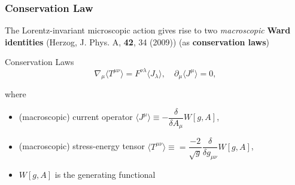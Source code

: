 \documentclass[10pt,aspectratio=43,xcolor=x11names,t]{beamer}%
\begin{document}
		\begin{frame}\frametitle{Conservation Law}
			The Lorentz-invariant microscopic action gives rise to two \emph{macroscopic} \textbf{Ward identities} ({\scriptsize Herzog, J. Phys. A, \textbf{42}, 34 (2009)}) (as \textbf{\color{red}conservation laws})
			\begin{redblock}{Conservation Laws}
				\begin{equation*}
					\nabla_\mu\langle T^{\mu\nu}\rangle=F^{\nu\lambda}\langle J_\lambda\rangle,\quad \partial_\mu\langle J^\mu\rangle=0,
				\end{equation*}
			\end{redblock}
			where
			\begin{itemize}
				\item (macroscopic) current operator $\langle J^\mu\rangle\equiv-\dfrac{\delta}{\delta A_\mu}W[g,A]$,
				\item (macroscopic) stress-energy tensor $\langle T^{\mu\nu}\rangle\equiv=\dfrac{-2}{\sqrt{g}}\dfrac{\delta}{\delta g_{\mu\nu}}W[g,A]$,
				\item $W[g,A]$ is the generating functional
			\end{itemize}
		\end{frame}
\end{document}

